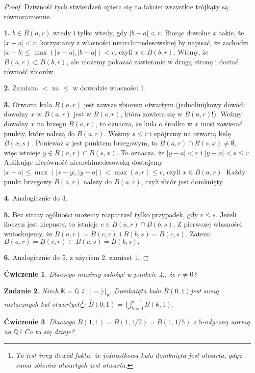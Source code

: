 \documentclass[a4paper,fleqn,9pt]{extarticle}
\newtheorem{prbh}{Zadanie}
\newtheorem{prb}[prbh]{\'Cwiczenie}
\begin{document}
\begin{proof}
Dziwność tych stwierdzeń opiera się na fakcie: wszystkie trójkąty są równoramienne.

\textbf{1.} $b\in B(a,r)$ wtedy i tylko wtedy, gdy $|b-a| < r$. Biorąc dowolne $x$ takie, że $|x-a| < r$, korzystamy z własności niearchimedesowskiej by napisać, że zachodzi $|x-b| \le \max (|x-a|, |b-a|) < r$, czyli $x\in B(b,r)$. Wiemy, że $B(a,r) \subset B(b,r)$, ale możemy pokazać zawieranie w drugą stronę i dostać równość zbiorów.

\textbf{2.} Zamiana $<$ na $\le$ w dowodzie własności 1.

\textbf{3.} Otwarta kula $B(a,r)$ jest zawsze zbiorem otwartym (jednolinijkowy dowód: dowolny $x$ w $B(a,r)$ jest w $B(a,r)$, która zawiera się w $B(a,r)$!). Weźmy dowolny $x$ na brzegu $B(a,r)$, to oznacza, że kula o środku w $x$ musi zawierać punkty, które należą do $B(a,r)$. Weźmy $s\le r$ i spójrzmy na otwartą kulę $B(x,s)$. Ponieważ $x$ jest punktem brzegowym, to $B(a,r) \cap B(s,x) \neq \emptyset$, więc istnieje $y\in B(a,r) \cap B(s,x)$. To oznacza, że $|y-a| < r$ i $|y-x| < s \le r$. Aplikując nierówność niearchimedesowską dostajemy $|x-a| \le \max(|x-y|, |y-a|) < \max(s,r) \le r$, czyli $x\in B(a,r)$. Każdy punkt brzegowy $B(a,r)$ należy do $B(a,r)$, czyli zbiór jest domknięty.

\textbf{4.} Analogicznie do 3.

\textbf{5.} Bez straty ogólności możemy rozpatrzeć tylko przypadek, gdy $r\le s$. Jeżeli iloczyn jest niepusty, to istnieje $c \in B(a,r) \cap B(b,s)$. Z pierwszej własności wnioskujemy, że $B(a,r) = B(c,r)$ i $B(b,s) = B(c,s)$. Zatem: $B(a,r) = B(c,r) \subset B(c,s) = B(b,s).$

\textbf{6.} Analogicznie do 5. z użyciem 2. zamiast 1.\end{proof}
\begin{prb}Dlaczego musimy założyć w punkcie 4., że $r\neq 0$?\end{prb}

\begin{prbh}Niech $\mathbb K = \mathbb Q$ i $|\cdot| = |\cdot|_p$. Domknięta kula $\overline{B}(0,1)$jest sumą rozłącznych kul otwartych\footnote{To jest inny dowód faktu, że jednostkowa kula domknięta jest otwarta, gdyż suma zbiorów otwartych jest otwarta.}: $\overline{B}(0,1) = \bigcup_{k=0}^{p-1} B(k,1)$. \end{prbh}

\begin{prb}Dlaczego $B(1,1) = B(1,1/2) = \overline{B}(1,1/5)$ z $5$-adyczną normą na $\mathbb Q$? Co tu się dzieje?\end{prb}
\end{document}
